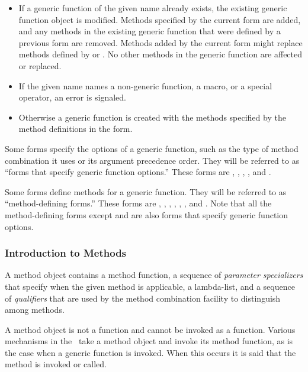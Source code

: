 \begin{itemize}

\item  If a generic function of the given name already exists,
the existing generic function object is modified.  Methods specified
by the current  form are added, and any methods in the
existing generic function that were defined by a previous 
 form are removed.  Methods added by the current 
 form might replace methods defined by  or
.  No other methods in the generic function are affected
or replaced.

\item  If the given name names a non-generic function, a
macro, or a special operator, an error is signaled.

\item  Otherwise a generic function is created with the
methods specified by the method definitions in the 
form.

\end{itemize}

Some forms specify the options of a generic function,
such as the type of method combination it uses or its argument
precedence order.  They will be referred to as ``forms that
specify generic function options.'' These forms are ,
, , , and
.

Some forms define methods for a generic function.  They will be
referred to as ``method-defining forms.'' These forms are 
, , , 
, , , and
. Note that all the method-defining forms except 
 and 
are also forms that specify generic function options.

\subsubsection{Introduction to Methods}
\label{Introduction-to-Methods-SECTION}

A method object contains a method function, a sequence of \emph{
parameter specializers\/} that specify when the given method is
applicable, a lambda-list, and a sequence of \emph{qualifiers\/} that
are used by the method combination facility to distinguish among
methods.

A method object is not a function and cannot be invoked as a function. 
Various mechanisms in the \OS\ take a method object and invoke its method
function, as is the case when a generic function is invoked.  When this
occurs it is said that the method is invoked or called.

